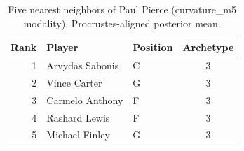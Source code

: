 \begin{table}[htbp]
  \centering\small
  \begin{tabular}{rllc}
    \toprule
    Rank & Player & Position & Archetype \\
    \midrule
    1 & Arvydas Sabonis & C & 3 \\
    2 & Vince Carter & G & 3 \\
    3 & Carmelo Anthony & F & 3 \\
    4 & Rashard Lewis & F & 3 \\
    5 & Michael Finley & G & 3 \\
    \bottomrule
  \end{tabular}
  \caption{Five nearest neighbors of Paul Pierce (curvature_m5 modality), Procrustes-aligned posterior mean.}
  \label{tab:Paul_Pierce_neighbors_curvature_m5}
\end{table}

